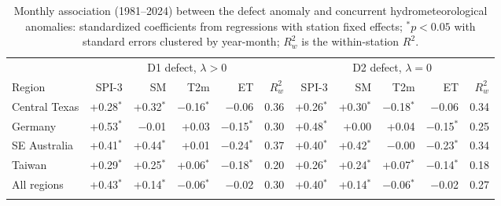 \begin{table}[tbp]
\caption{Monthly association (1981--2024) between the defect anomaly and concurrent
hydrometeorological anomalies: standardized coefficients from regressions with station fixed effects;
$^{\ast}p<0.05$ with standard errors clustered by year-month; $R^2_w$ is the within-station $R^2$.}
\label{tab:assoc}
\footnotesize\setlength{\tabcolsep}{4pt}
\begin{tabular*}{\textwidth}{@{\extracolsep\fill}lrrrrrrrrrr}
\toprule
& \multicolumn{5}{c}{D1 defect, $\lambda>0$} & \multicolumn{5}{c}{D2 defect, $\lambda=0$}\\
\cmidrule{2-6}\cmidrule{7-11}
Region & SPI-3 & SM & T2m & ET & $R^2_w$ & SPI-3 & SM & T2m & ET & $R^2_w$\\
\midrule
Central Texas & +0.28$^{\ast}$ & +0.32$^{\ast}$ & $-$0.16$^{\ast}$ & $-$0.06 & 0.36 & +0.26$^{\ast}$ & +0.30$^{\ast}$ & $-$0.18$^{\ast}$ & $-$0.06 & 0.34 \\
Germany & +0.53$^{\ast}$ & $-$0.01 & +0.03 & $-$0.15$^{\ast}$ & 0.30 & +0.48$^{\ast}$ & +0.00 & +0.04 & $-$0.15$^{\ast}$ & 0.25 \\
SE Australia & +0.41$^{\ast}$ & +0.44$^{\ast}$ & +0.01 & $-$0.24$^{\ast}$ & 0.37 & +0.40$^{\ast}$ & +0.42$^{\ast}$ & $-$0.00 & $-$0.23$^{\ast}$ & 0.34 \\
Taiwan & +0.29$^{\ast}$ & +0.25$^{\ast}$ & +0.06$^{\ast}$ & $-$0.18$^{\ast}$ & 0.20 & +0.26$^{\ast}$ & +0.24$^{\ast}$ & +0.07$^{\ast}$ & $-$0.14$^{\ast}$ & 0.18 \\
All regions & +0.43$^{\ast}$ & +0.14$^{\ast}$ & $-$0.06$^{\ast}$ & $-$0.02 & 0.30 & +0.40$^{\ast}$ & +0.14$^{\ast}$ & $-$0.06$^{\ast}$ & $-$0.02 & 0.27 \\
\botrule
\end{tabular*}
\end{table}
